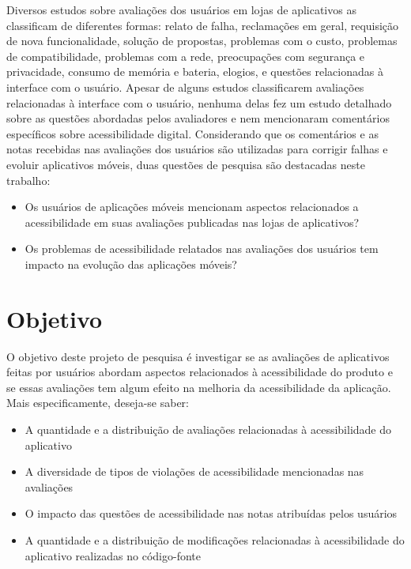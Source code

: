 Diversos estudos sobre avaliações dos usuários em lojas de aplicativos as classificam de diferentes formas\cite{Iacob2013retrieving,Pagano2013userfeedback,Iacob2014online,Mcilroy2016analyzing,Sorbo2017surf,Ciurumelea2017analyzing,Ortega2015thesis,Li2018MobileAE,Pelloni2018becloma,Panichella2015how}: 
relato de falha, reclamações em geral, requisição de nova funcionalidade, solução de propostas, problemas com o custo, problemas de compatibilidade, problemas com a rede, preocupações com segurança e privacidade, consumo de memória e bateria, elogios, e questões relacionadas à interface com o usuário.
Apesar de alguns estudos classificarem avaliações relacionadas à interface com o usuário, nenhuma delas fez um estudo detalhado sobre as questões abordadas pelos avaliadores e nem mencionaram comentários específicos sobre acessibilidade digital.
Considerando que os comentários e as notas recebidas nas avaliações dos usuários são utilizadas para corrigir falhas e evoluir aplicativos móveis, duas questões de pesquisa são destacadas neste trabalho:
\begin{itemize}
 \item Os usuários de aplicações móveis mencionam aspectos relacionados a acessibilidade em suas avaliações publicadas nas lojas de aplicativos?
 \item Os problemas de acessibilidade relatados nas avaliações dos usuários tem impacto na evolução das aplicações móveis?
\end{itemize}

\section{Objetivo} 

O objetivo deste projeto de pesquisa é investigar se as avaliações de aplicativos feitas por usuários abordam aspectos relacionados à acessibilidade do produto e se essas avaliações tem algum efeito na melhoria da acessibilidade da aplicação. Mais especificamente, deseja-se saber:
\begin{itemize}
 \item A quantidade e a distribuição de avaliações relacionadas à acessibilidade do aplicativo
 \item A diversidade de tipos de violações de acessibilidade mencionadas nas avaliações
 \item O impacto das questões de acessibilidade nas notas atribuídas pelos usuários
 \item A quantidade e a distribuição de modificações relacionadas à acessibilidade do aplicativo realizadas no código-fonte
\end{itemize}



